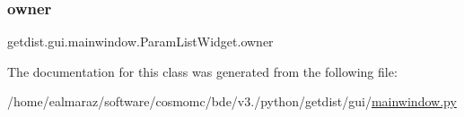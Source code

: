 \subsubsection{\texorpdfstring{owner}{owner}}
{\footnotesize\ttfamily getdist.\+gui.\+mainwindow.\+Param\+List\+Widget.\+owner}



The documentation for this class was generated from the following file\+:\begin{DoxyCompactItemize}
\item 
/home/ealmaraz/software/cosmomc/bde/v3./python/getdist/gui/\mbox{\hyperlink{mainwindow_8py}{mainwindow.\+py}}\end{DoxyCompactItemize}
